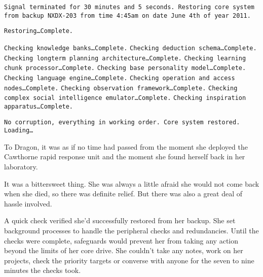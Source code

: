 

\texttt{Signal terminated for 30 minutes and 5 seconds.  Restoring core system from backup NXDX-203 from time 4:45am on date June 4th of year 2011.}

\texttt{Restoring\ldots  Complete.}

\texttt{Checking knowledge banks\ldots  Complete.}\linebreak
\texttt{Checking deduction schema\ldots Complete.}\linebreak
\texttt{Checking longterm planning architecture\ldots Complete.}\linebreak
\texttt{Checking learning chunk processor\ldots Complete.}\linebreak
\texttt{Checking base personality model\ldots Complete.}\linebreak
\texttt{Checking language engine\ldots Complete.}\linebreak
\texttt{Checking operation and access nodes\ldots Complete.}\linebreak
\texttt{Checking observation framework\ldots Complete.}\linebreak
\texttt{Checking complex social intelligence emulator\ldots Complete.}\linebreak
\texttt{Checking inspiration apparatus\ldots Complete.}

\texttt{No corruption, everything in working order.  Core system restored.  Loading\ldots}


\sectionbreak



To Dragon, it was as if no time had passed from the moment she deployed the Cawthorne rapid response unit and the moment she found herself back in her laboratory.



It was a bittersweet thing.  She was always a little afraid she would not come back when she died, so there was definite relief.  But there was also a great deal of hassle involved.



A quick check verified she'd successfully restored from her backup.  She set background processes to handle the peripheral checks and redundancies.  Until the checks were complete, safeguards would prevent her from taking any action beyond the limits of her core drive.  She couldn't take any notes, work on her projects, check the priority targets or converse with anyone for the seven to nine minutes the checks took.



